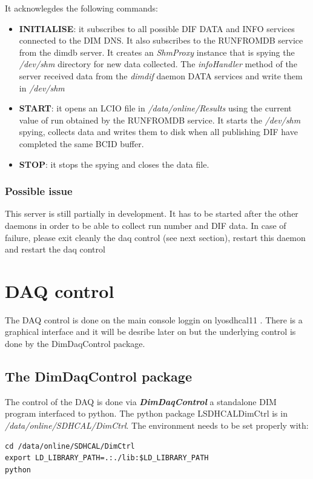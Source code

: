 \documentclass[english]{article}
\begin{document}
 It acknowlegdes the following commands:
 \begin{itemize}
\item {\bf INITIALISE}: it subscribes to all possible DIF DATA and INFO services connected to the DIM DNS. It also subscribes to the RUNFROMDB service from the dimdb server. It creates an {\sl ShmProxy} instance that is spying the {\sl /dev/shm} directory for new data collected. The {\sl infoHandler} method of the server received data from the {\sl dimdif} daemon DATA services and write them in {\sl /dev/shm}
\item {\bf START}: it opens an LCIO file in {\sl /data/online/Results} using the current value of run obtained by the RUNFROMDB service. It starts the {\sl /dev/shm} spying, collects data and writes them to disk when all publishing DIF have completed the same BCID buffer.
\item {\bf STOP}: it stops the spying and closes the data file.
\end{itemize}

\subsubsection{Possible issue}

This server is still partially in development. It has to be started after the other daemons in order to be able
to collect run number and DIF data. In case of failure, please exit cleanly the daq control (see next section), restart this daemon and restart the daq control   

\section {DAQ control}

The DAQ control is done on the main console loggin on lyosdhcal11 . There is a graphical interface and it will be desribe later on but the underlying control is done by the DimDaqControl package.

\subsection{ The DimDaqControl package }
The control of the DAQ is done via { \bf \sl DimDaqControl } a standalone DIM program interfaced to python. The python package LSDHCALDimCtrl  is in {\sl /data/online/SDHCAL/DimCtrl}. The environment needs to be set properly with:

\begin{verbatim}
cd /data/online/SDHCAL/DimCtrl
export LD_LIBRARY_PATH=.:./lib:$LD_LIBRARY_PATH
python
\end{verbatim}  
\end{document}
